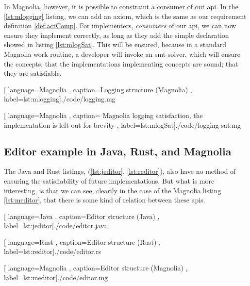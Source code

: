 In Magnolia, however, it is possible to constraint a consumer of out \gls{api}.
In the \ref{lst:mlogging} listing, we can add an axiom, which is the same as our
requirement definition \ref{def:actComp}. For implementers, \textit{consumers}
of our \gls{api}, we can now ensure they implement correctly, as long as they
add the simple declaration showed in listing \ref{lst:mlogSat}. This will be
ensured, because in a standard Magnolia work routine, a developer will invoke an
\gls{smt} solver, which will ensure the concepts, that the implementations
implementing concepts are sound; that they are satisfiable.

\begin{center}
  
    [ language=Magnolia
    , caption={Logging structure (Magnolia)}
    , label=lst:mlogging]{./code/logging.mg}
\end{center}

\begin{center}
  
    [ language=Magnolia
    , caption={
        Magnolia logging satisfaction, the implementation is left out for
        brevity
      }
    , label=lst:mlogSat]{./code/logging-sat.mg}
\end{center}

\subsection{Editor example in Java, Rust, and Magnolia}

The Java and Rust listings, (\ref{lst:jeditor}, \ref{lst:reditor}), also have no
method of ensuring the satisfiability of future implementations. But what is
more interesting, is that we can see, clearily in the case of the Magnolia
listing \ref{lst:meditor}, that there is some kind of relation between these
\gls{api}s.

\begin{code}[H]
  
    [ language=Java
    , caption={Editor structure (Java)}
    , label=lst:jeditor]{./code/editor.java}
\end{code}

\begin{code}[H]
  
    [ language=Rust
    , caption={Editor structure (Rust)}
    , label=lst:reditor]{./code/editor.rs}
\end{code}

\begin{code}[H]
  
    [ language=Magnolia
    , caption={Editor structure (Magnolia)}
    , label=lst:meditor]{./code/editor.mg}
\end{code}

